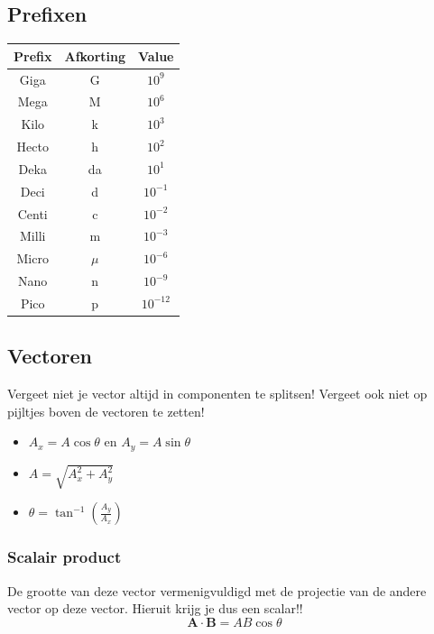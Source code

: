 \documentclass[12pt,a4paper]{article}
\begin{document}
    \subsection{Prefixen}
    \begin{center}
        \begin{tabular}{ | c | c | c | }
            \hline
            Prefix & Afkorting & Value      \\
            \hline
            Giga   & G         & $10^{9}$   \\
            Mega   & M         & $10^{6}$   \\
            Kilo   & k         & $10^{3}$   \\
            Hecto  & h         & $10^{2}$   \\
            Deka   & da        & $10^{1}$   \\
            Deci   & d         & $10^{-1}$  \\
            Centi  & c         & $10^{-2}$  \\
            Milli  & m         & $10^{-3}$  \\
            Micro  & $\mu$     & $10^{-6}$  \\
            Nano   & n         & $10^{-9}$  \\
            Pico   & p         & $10^{-12}$ \\
            \hline
        \end{tabular}
    \end{center}

    \subsection{Vectoren}
    Vergeet niet je vector altijd in componenten te splitsen! Vergeet ook niet op pijltjes boven de vectoren te zetten!

    \begin{itemize}
        \item \(A_x = A\cos\theta\) en \(A_y = A\sin\theta\)
        \item \(A = \sqrt{A_x^2 + A_y^2}\)
        \item \(\theta = \tan^{-1}(\frac{A_y}{A_x})\)
    \end{itemize}

    \subsubsection{Scalair product}
    De grootte van deze vector vermenigvuldigd met de projectie van de andere vector op deze vector. Hieruit krijg je dus een scalar!!
    \[\textbf{A} \cdot \textbf{B} = AB \cos\theta\]
\end{document}
